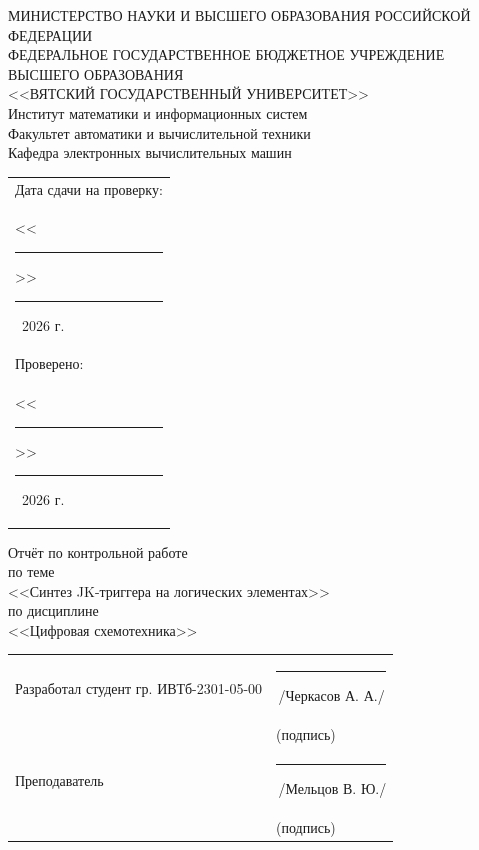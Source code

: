\documentclass[oneside,a4paper,14pt]{extarticle}
\begin{document}
\newpage
\thispagestyle{empty}
\begin{center}
  МИНИСТЕРСТВО НАУКИ И ВЫСШЕГО ОБРАЗОВАНИЯ РОССИЙСКОЙ ФЕДЕРАЦИИ\\
  ФЕДЕРАЛЬНОЕ ГОСУДАРСТВЕННОЕ БЮДЖЕТНОЕ УЧРЕЖДЕНИЕ ВЫСШЕГО ОБРАЗОВАНИЯ\\
  <<ВЯТСКИЙ ГОСУДАРСТВЕННЫЙ УНИВЕРСИТЕТ>>\\
  Институт математики и информационных систем\\
  Факультет автоматики и вычислительной техники\\
  Кафедра электронных вычислительных машин
\end{center}
\vspace{10mm}

\hfill
\begin{tabular}{l}
  \footnotesize Дата сдачи на проверку:                                          \\
  \footnotesize <<\rule[-1mm]{5mm}{0.10mm}\/>>\rule[-1mm]{20mm}{0.10mm}\ 2026 г. \\
  \footnotesize Проверено:                                                       \\
  \footnotesize <<\rule[-1mm]{5mm}{0.10mm}\/>>\rule[-1mm]{20mm}{0.10mm}\ 2026 г. \\
\end{tabular}
\vfill

\begin{center}
  Отчёт по контрольной работе\\
  по теме\\
  <<Синтез JK-триггера на логических элементах>>\\
  по дисциплине\\
  <<Цифровая схемотехника>>\\
\end{center}
\vspace{25mm}
\noindent
\begin{tabular}{ll}
  Разработал студент гр. ИВТб-2301-05-00 & \hspace{5mm}\rule[-1mm]{30mm}{0.10mm}\,/Черкасов А. А./ \\
                                           & \hspace{12.5mm}\footnotesize(подпись)                   \\
  Преподаватель                            & \hspace{5mm}\rule[-1mm]{30mm}{0.10mm}\,/Мельцов В. Ю./  \\
                                           & \hspace{12.5mm}\footnotesize(подпись)                   \\
\end{tabular}
\end{document}
